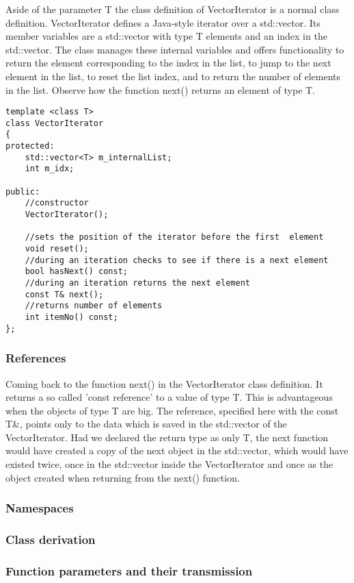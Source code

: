Aside of the parameter T the class definition of VectorIterator is a normal class definition. VectorIterator defines a Java-style iterator over a std::vector. Its member variables are a std::vector with type T elements and an index in the std::vector. The class manages these internal variables and offers functionality to return the element corresponding to the index in the list, to jump to the next element in the list, to reset the list index, and to return the number of elements in the list. Observe how the function next() returns an element of type T.

\begin{lstlisting}
template <class T>
class VectorIterator
{
protected:
    std::vector<T> m_internalList;
    int m_idx;

public:
    //constructor
    VectorIterator();

    //sets the position of the iterator before the first  element
    void reset();
    //during an iteration checks to see if there is a next element
    bool hasNext() const;
    //during an iteration returns the next element
    const T& next();
    //returns number of elements
    int itemNo() const;
};

\end{lstlisting}

\subsubsection {References}

Coming back to the function next() in the VectorIterator class definition. It returns a so called 'const reference' to a value of type T. This is advantageous when the objects of type T are big. The reference, specified here with the const T\&, points only to the data which is saved in the std::vector of the VectorIterator. Had we declared the return type as only T, the next function would have created a copy of the next object in the std::vector, which would have existed twice, once in the std::vector inside the VectorIterator and once as the object created when returning from the next() function.

\subsubsection {Namespaces}
\subsubsection {Class derivation}
\subsubsection {Function parameters and their transmission}
